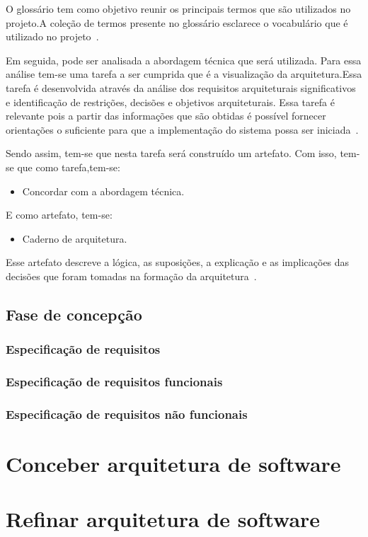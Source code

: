 O glossário tem como objetivo reunir os principais termos que são utilizados no projeto.A coleção de termos presente no glossário esclarece o vocabulário que é utilizado no projeto~\cite{openup}.  

Em seguida, pode ser analisada a abordagem técnica que será utilizada. Para essa análise tem-se uma tarefa a ser cumprida que é a visualização da arquitetura.Essa tarefa é desenvolvida através da análise dos requisitos arquiteturais significativos e identificação de restrições, decisões e objetivos arquiteturais. Essa tarefa é relevante pois a partir das informações que são obtidas é possível fornecer orientações o suficiente para que a implementação do sistema possa ser iniciada~\cite{openup}.

Sendo assim, tem-se que nesta tarefa será construído um artefato. Com isso, tem-se que como tarefa,tem-se:
\begin{itemize}
    \item Concordar com a abordagem técnica.
\end{itemize}
E como artefato, tem-se:
    \begin{itemize}
        \item Caderno de arquitetura.
    \end{itemize}
Esse artefato descreve a lógica, as suposições, a explicação e as implicações das decisões que foram tomadas na formação da arquitetura~\cite{openup}.

\subsection{Fase de concepção}
\subsubsection{Especificação de requisitos}
\subsubsection{Especificação de requisitos funcionais}
\subsubsection{Especificação de requisitos não funcionais}
\section{Conceber arquitetura de software}
\section{Refinar arquitetura de software}